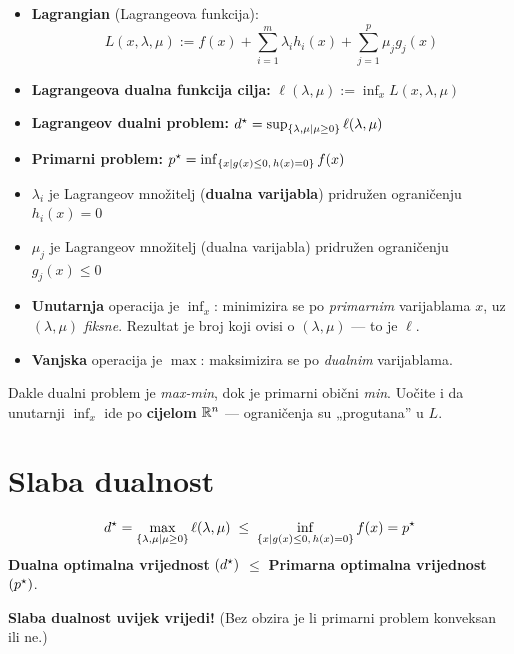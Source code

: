 \begin{definicija}
\begin{itemize}
  \item \textbf{Lagrangian} (Lagrangeova funkcija):
        \[
        L(x,\lambda,\mu) := f(x) + \sum_{i=1}^{m}\lambda_ih_i(x)
                                 + \sum_{j=1}^{p}\mu_jg_j(x)
        \]
  \item \textbf{Lagrangeova dualna funkcija cilja:}
        $\ell(\lambda,\mu) := \inf_x L(x,\lambda,\mu)$
  \item \textbf{Lagrangeov dualni problem:}
        $d^{\star} = \sup_{\{\lambda,\mu \mid \mu\ge0\}} \ell(\lambda,\mu)$
  \item \textbf{Primarni problem:}
        $p^{\star} = \inf_{\{x \mid g(x)\le0,\,h(x)=0\}} f(x)$
  \item $\lambda_i$ je Lagrangeov množitelj (\textbf{dualna varijabla})
        pridružen ograničenju $h_i(x) = 0$
  \item $\mu_j$ je Lagrangeov množitelj (dualna varijabla) pridružen
        ograničenju $g_j(x) \le 0$
\end{itemize}
\end{definicija}

\begin{napomena}
\begin{itemize}
  \item \textbf{Unutarnja} operacija je $\inf_x$: minimizira se po
        \emph{primarnim} varijablama $x$, uz $(\lambda,\mu)$ \emph{fiksne}.
        Rezultat je broj koji ovisi o $(\lambda,\mu)$ --- to je $\ell$.
  \item \textbf{Vanjska} operacija je $\max$: maksimizira se po
        \emph{dualnim} varijablama.
\end{itemize}
Dakle dualni problem je \emph{max-min}, dok je primarni obični \emph{min}.
Uočite i da unutarnji $\inf_x$ ide po \textbf{cijelom} $\mathbb{R}^n$ --- ograničenja
su „progutana” u $L$.
\end{napomena}

\section{Slaba dualnost}

\begin{teorem}
\[
d^{\star} = \max_{\{\lambda,\mu \mid \mu\ge0\}} \ell(\lambda,\mu)
\;\le\; \inf_{\{x \mid g(x)\le0,\,h(x)=0\}} f(x) = p^{\star}
\]
\textbf{Dualna optimalna vrijednost} $(d^{\star})$ $\le$ \textbf{Primarna optimalna
vrijednost} $(p^{\star})$.

\textbf{Slaba dualnost uvijek vrijedi!} (Bez obzira je li primarni problem
konveksan ili ne.)
\end{teorem}

